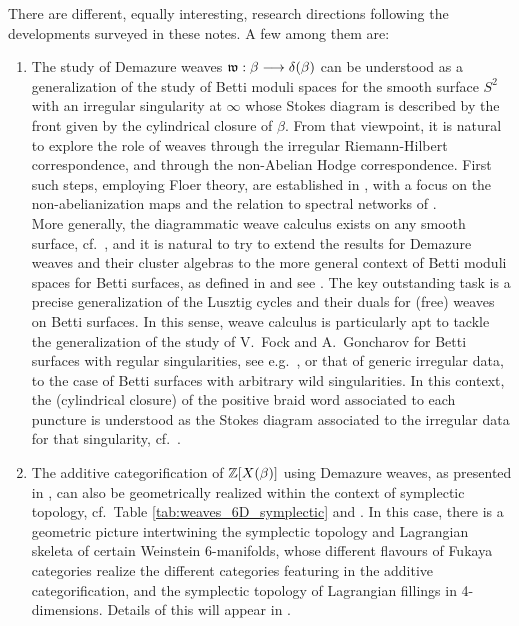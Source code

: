  There are different, equally interesting, research directions following the developments surveyed in these notes. A few among them are:\\

\begin{enumerate}
    \item The study of Demazure weaves $\mathfrak{w}:\beta\longrightarrow\delta(\beta)$ can be understood as a generalization of the study of Betti moduli spaces for the smooth surface $S^2$ with an irregular singularity at $\infty$ whose Stokes diagram is described by the front given by the cylindrical closure of $\beta$. From that viewpoint, it is natural to explore the role of weaves through the irregular Riemann-Hilbert correspondence, and through the non-Abelian Hodge correspondence. First such steps, employing Floer theory, are established in \cite{casals2025spectralnetworksbettilagrangians}, with a focus on the non-abelianization maps and the relation to spectral networks of \cite{GNMSN,GMN14_Snakes}.\\

    More generally, the diagrammatic weave calculus exists on any smooth surface, cf.~\cite{CasalsZaslow}, and it is natural to try to extend the results for Demazure weaves and their cluster algebras to the more general context of Betti moduli spaces for Betti surfaces, as defined in \cite{casals2025spectralnetworksbettilagrangians} and see . The key outstanding task is a precise generalization of the Lusztig cycles and their duals for (free) weaves on Betti surfaces. In this sense, weave calculus is particularly apt to tackle the generalization of the study of V.~Fock and A.~Goncharov for Betti surfaces with regular singularities, see e.g.~\cite{FockGoncharov09_Dilog2,FG2006,FG06a,Gon17}, or that of generic irregular data, to the case of Betti surfaces with arbitrary wild singularities. In this context, the (cylindrical closure) of the positive braid word associated to each puncture is understood as the Stokes diagram associated to the irregular data for that singularity, cf.~\cite[Section 2]{casals2025spectralnetworksbettilagrangians}.\\

    \item The additive categorification of $\mathbb{Z}[X(\beta)]$ using Demazure weaves, as presented in \cite{CasalsChrist}, can also be geometrically realized within the context of symplectic topology, cf.~Table \ref{tab:weaves_6D_symplectic} and . In this case, there is a geometric picture intertwining the symplectic topology and Lagrangian skeleta of certain Weinstein 6-manifolds, whose different flavours of Fukaya categories realize the different categories featuring in the additive categorification, and the symplectic topology of Lagrangian fillings in 4-dimensions. Details of this will appear in \cite{CasalsChrist2}.\\


\end{enumerate}
